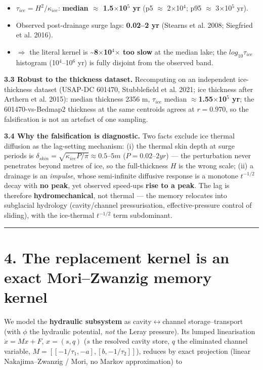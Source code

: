 \documentclass[11pt]{article}
\begin{document}
\begin{itemize}
\item $\tau _{ice} = H^{2}/\kappa _{ice}$: \textbf{median \ensuremath{\approx} 1.5\ensuremath{\times}10\ensuremath{^{5}} yr} (p5 \ensuremath{\approx} 2\ensuremath{\times}10\ensuremath{^{4}}; p95 \ensuremath{\approx} 3\ensuremath{\times}10\ensuremath{^{5}} yr).
\item Observed post-drainage surge lags: \textbf{0.02–2 yr} (Stearns et al. 2008; Siegfried et al. 2016).
\item \ensuremath{\Rightarrow} the literal kernel is \textbf{\textasciitilde{}8\ensuremath{\times}10\ensuremath{^{4}}\ensuremath{\times} too slow} at the median lake; the $log_{10} \tau _{ice}$ histogram (10\ensuremath{^{4}}–10\ensuremath{^{6}} yr) is fully disjoint from the observed band.
\end{itemize}


\textbf{3.3 Robust to the thickness dataset.} Recomputing on an independent ice-thickness dataset (USAP-DC 601470, Stubblefield et al. 2021; ice thickness after Arthern et al. 2015): median thickness 2356 m, $\tau _{ice}$ median \textbf{\ensuremath{\approx}1.55\ensuremath{\times}10\ensuremath{^{5}} yr}; the 601470-vs-Bedmap2 thickness at the same centroids agrees at \textbf{$r=0.970$}, so the falsification is not an artefact of one sampling.


\textbf{3.4 Why the falsification is diagnostic.} Two facts exclude ice thermal diffusion as the lag-setting mechanism: (i) the thermal skin depth at surge periods is $\delta _{skin}=\sqrt{\kappa _{ice} P/\pi }\approx 0.5–5 m$ ($P=0.02–2 yr$) — the perturbation never penetrates beyond metres of ice, so the full-thickness $H$ is the wrong scale; (ii) a drainage is an \emph{impulse}, whose semi-infinite diffusive response is a monotone $t^{-1/2}$ decay with \textbf{no peak}, yet observed speed-ups \textbf{rise to a peak}. The lag is therefore \textbf{hydromechanical}, not thermal — the memory relocates into subglacial hydrology (cavity/channel pressurisation, effective-pressure control of sliding), with the ice-thermal $t^{-1/2}$ term subdominant.


\medskip\hrule\medskip


\section*{4. The replacement kernel is an exact Mori–Zwanzig memory kernel}


We model the \textbf{hydraulic subsystem} as cavity\ensuremath{\leftrightarrow}channel storage–transport (with $\phi $ the hydraulic potential, \emph{not} the Leray pressure). Its lumped linearisation $\dot{x}=Mx+F$, $x=(s,q)$ ($s$ the resolved cavity store, $q$ the eliminated channel variable, $M=[[-1/\tau _{1},-a],[b,-1/\tau _{2}]]$), reduces by exact projection (linear Nakajima–Zwanzig / Mori, no Markov approximation) to
\end{document}
